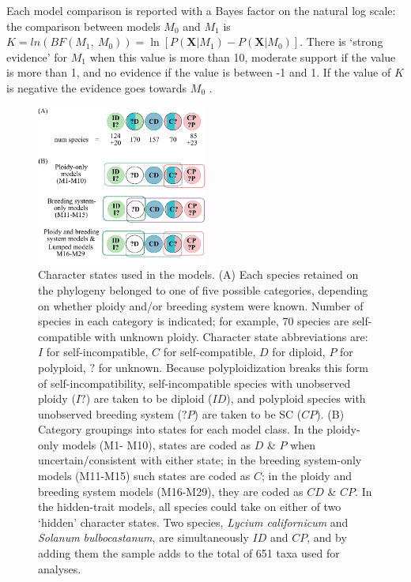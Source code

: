 Each model comparison is reported with a Bayes factor on the natural log scale: the comparison between models $M_0$ and $M_1$ is $K=ln(BF(M_1,\ M_0)) = \ln[ P(\mathbf{X} | M_1) - P(\mathbf{X} | M_0)]$.
There is `strong evidence' for $M_1$ when this value is more than 10, moderate support if the value is more than 1, and no evidence if the value is between -1 and 1.
If the value of $K$ is negative the evidence goes towards $M_0$ \citep{kass1995}.

\begin{figure}
\centering
\includegraphics[width=0.5\textwidth]{states.pdf}
\caption{
Character states used in the models.
(A) Each species retained on the phylogeny belonged to one of five possible categories, depending on whether ploidy and/or breeding system were known. 
Number of species in each category is indicated; for example, 70 species are self-compatible with unknown ploidy.
Character state abbreviations are: $I$ for self-incompatible, $C$ for self-compatible, $D$ for diploid, $P$ for polyploid, $?$ for unknown.
Because polyploidization breaks this form of self-incompatibility, self-incompatible species with unobserved ploidy ($I?$) are taken to be diploid ($ID$), and polyploid species with unobserved breeding system ($?P$) are taken to be SC ($CP$).
(B) Category groupings into states for each model class.
In the ploidy-only models (M1- M10), states are coded as $D$ \& $P$ when uncertain/consistent with either state; in the breeding system-only models (M11-M15) such states are coded as $C$; in the ploidy and breeding system models (M16-M29), they are coded as $CD$ \& $CP$.
In the hidden-trait models, all species could take on either of two `hidden' character states. %
Two species, \emph{Lycium californicum} and \emph{Solanum bulbocastanum}, are simultaneously $ID$ and $CP$, and by adding them the sample adds to the total of 651 taxa used for analyses.
}
\label{figure:stateclassifications}
\end{figure}

